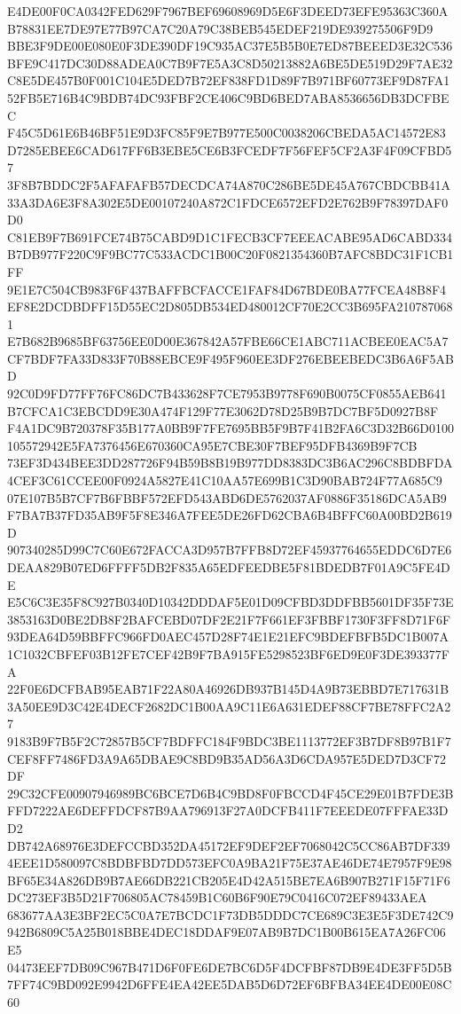 \documentclass[UTF8,fontset=fandol,zihao=-4,a4paper]{ctexart}
\begin{document}
{{E4DE00F0CA0342FED629F7967BEF69608969D5E6F3DEED73EFE95363C360AB78831EE7DE97E77B97CA7C20A79C38BEB545EDEF219DE939275506F9D9
BBE3F9DE00E080E0F3DE390DF19C935AC37E5B5B0E7ED87BEEED3E32C536BFE9C417DC30D88ADEA0C7B9F7E5A3C8D50213882A6BE5DE519D29F7AE32
C8E5DE457B0F001C104E5DED7B72EF838FD1D89F7B971BF60773EF9D87FA152FB5E716B4C9BDB74DC93FBF2CE406C9BD6BED7ABA8536656DB3DCFBEC
F45C5D61E6B46BF51E9D3FC85F9E7B977E500C0038206CBEDA5AC14572E83D7285EBEE6CAD617FF6B3EBE5CE6B3FCEDF7F56FEF5CF2A3F4F09CFBD57
3F8B7BDDC2F5AFAFAFB57DECDCA74A870C286BE5DE45A767CBDCBB41A33A3DA6E3F8A302E5DE00107240A872C1FDCE6572EFD2E762B9F78397DAF0D0
C81EB9F7B691FCE74B75CABD9D1C1FECB3CF7EEEACABE95AD6CABD334B7DB977F220C9F9BC77C533ACDC1B00C20F0821354360B7AFC8BDC31F1CB1FF
9E1E7C504CB983F6F437BAFFBCFACCE1FAF84D67BDE0BA77FCEA48B8F4EF8E2DCDBDFF15D55EC2D805DB534ED480012CF70E2CC3B695FA2107870681
E7B682B9685BF63756EE0D00E367842A57FBE66CE1ABC711ACBEE0EAC5A7CF7BDF7FA33D833F70B88EBCE9F495F960EE3DF276EBEEBEDC3B6A6F5ABD
92C0D9FD77FF76FC86DC7B433628F7CE7953B9778F690B0075CF0855AEB641B7CFCA1C3EBCDD9E30A474F129F77E3062D78D25B9B7DC7BF5D0927B8F
F4A1DC9B720378F35B177A0BB9F7FE7695BB5F9B7F41B2FA6C3D32B66D0100105572942E5FA7376456E670360CA95E7CBE30F7BEF95DFB4369B9F7CB
73EF3D434BEE3DD287726F94B59B8B19B977DD8383DC3B6AC296C8BDBFDA4CEF3C61CCEE00F0924A5827E41C10AA57E699B1C3D90BAB724F77A685C9
07E107B5B7CF7B6FBBF572EFD543ABD6DE5762037AF0886F35186DCA5AB9F7BA7B37FD35AB9F5F8E346A7FEE5DE26FD62CBA6B4BFFC60A00BD2B619D
907340285D99C7C60E672FACCA3D957B7FFB8D72EF45937764655EDDC6D7E6DEAA829B07ED6FFFF5DB2F835A65EDFEEDBE5F81BDEDB7F01A9C5FE4DE
E5C6C3E35F8C927B0340D10342DDDAF5E01D09CFBD3DDFBB5601DF35F73E3853163D0BE2DB8F2BAFCEBD07DF2E21F7F661EF3FBBF1730F3FF8D71F6F
93DEA64D59BBFFC966FD0AEC457D28F74E1E21EFC9BDEFBFB5DC1B007A1C1032CBFEF03B12FE7CEF42B9F7BA915FE5298523BF6ED9E0F3DE393377FA
22F0E6DCFBAB95EAB71F22A80A46926DB937B145D4A9B73EBBD7E717631B3A50EE9D3C42E4DECF2682DC1B00AA9C11E6A631EDEF88CF7BE78FFC2A27
9183B9F7B5F2C72857B5CF7BDFFC184F9BDC3BE1113772EF3B7DF8B97B1F7CEF8FF7486FD3A9A65DBAE9C8BD9B35AD56A3D6CDA957E5DED7D3CF72DF
29C32CFE00907946989BC6BCE7D6B4C9BD8F0FBCCD4F45CE29E01B7FDE3BFFD7222AE6DEFFDCF87B9AA796913F27A0DCFB411F7EEEDE07FFFAE33DD2
DB742A68976E3DEFCCBD352DA45172EF9DEF2EF7068042C5CC86AB7DF3394EEE1D580097C8BDBFBD7DD573EFC0A9BA21F75E37AE46DE74E7957F9E98
BF65E34A826DB9B7AE66DB221CB205E4D42A515BE7EA6B907B271F15F71F6DC273EF3B5D21F706805AC78459B1C60B6F90E79C0416C072EF89433AEA
683677AA3E3BF2EC5C0A7E7BCDC1F73DB5DDDC7CE689C3E3E5F3DE742C9942B6809C5A25B018BBE4DEC18DDAF9E07AB9B7DC1B00B615EA7A26FC06E5
04473EEF7DB09C967B471D6F0FE6DE7BC6D5F4DCFBF87DB9E4DE3FF5D5B7FF74C9BD092E9942D6FFE4EA42EE5DAB5D6D72EF6BFBA34EE4DE00E08C60
}}
\end{document}

